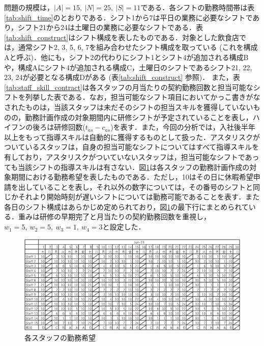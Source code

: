 \documentclass[11pt]{jsarticle}
\begin{document}
問題の規模は，$|A| = 15, \ |N| = 25, \ |S| = 11$である．各シフトの勤務時間帯は表\ref{tab:shift_time}のとおりである．シフト1から7は平日の業務に必要なシフトであり，シフト21から24は土曜日の業務に必要なシフトである．表\ref{tab:shift_construct}はシフト構成を表したものである．対象とした飲食店では，通常シフト2, 3, 5, 6, 7を組み合わせたシフト構成を取っている (これを構成Aと呼ぶ)．他にも，シフト2の代わりにシフト1とシフト4が追加される構成Bや，構成Aにシフト4が追加される構成C，土曜日のシフトであるシフト21, 22, 23, 24が必要となる構成Dがある (表\ref{tab:shift_construct} 参照)． また，表\ref{tab:staff_skill_contract}は各スタッフの月当たりの契約勤務回数と担当可能なシフトを列挙した表である．なお，担当可能なシフト項目においてかっこ書きがなされたものは，当該スタッフは未だそのシフトの担当スキルを獲得していないものの，勤務計画作成の対象期間内に研修シフトが予定されていることを表し，ハイフンの後ろは研修回数($t_{as} - c_{as}$)を表す．また，今回の分析では，入社後半年以上をもって指導スキルは自動的に獲得するものとして扱った．アスタリスクがついているスタッフは，自身の担当可能なシフトについてはすべて指導スキルを有しており，アスタリスクがついていないスタッフは，担当可能なシフトであっても当該シフトの指導スキルは有さない．図\ref{fig:shift_preference}は各スタッフの勤務計画作成の対象期間における勤務希望を表したものである．ただし，10はその日に休暇希望申請を出していることを表し，それ以外の数字については，その番号のシフトと同じかそれより開始時刻が遅いシフトについては勤務可能であることを表す．また各日のシフト構成はあらかじめ定められており，図\ref{fig:shift_preference}の最下行にまとめられている．重みは研修の早期完了と月当たりの契約勤務回数を重視し，$w_1 = 5, \ w_2 = 5, \ w_3 = 1, \ w_4 = 3$と設定した．

\begin{figure}
  \begin{center}
    \includegraphics[width = 13.2cm]{figs/june_preference.eps}
  \end{center}
  \caption{各スタッフの勤務希望}
  \label{fig:shift_preference}
\end{figure}
\end{document}
